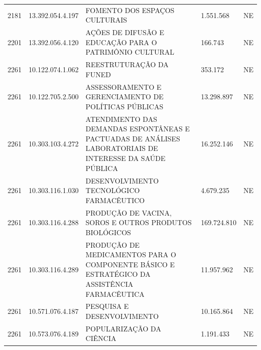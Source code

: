 \documentclass{article}
\begin{document}
\begin{longtable}[c]{m{1cm}|m{2cm}|m{10cm}|m{2cm}|m{1cm}}
\multicolumn{1}{C{1cm}|}{2181} & \multicolumn{1}{C{2cm}|}{13.392.054.4.197} & \multicolumn{1}{L{10cm}|}{FOMENTO DOS ESPAÇOS CULTURAIS} & \multicolumn{1}{R{2cm}|}{1.551.568} & \multicolumn{1}{C{1cm}}{NE} \\
\multicolumn{1}{C{1cm}|}{2201} & \multicolumn{1}{C{2cm}|}{13.392.056.4.120} & \multicolumn{1}{L{10cm}|}{AÇÕES DE DIFUSÃO E EDUCAÇÃO PARA O PATRIMÔNIO CULTURAL} & \multicolumn{1}{R{2cm}|}{166.743} & \multicolumn{1}{C{1cm}}{NE} \\
\multicolumn{1}{C{1cm}|}{2261} & \multicolumn{1}{C{2cm}|}{10.122.074.1.062} & \multicolumn{1}{L{10cm}|}{REESTRUTURAÇÃO DA FUNED} & \multicolumn{1}{R{2cm}|}{353.172} & \multicolumn{1}{C{1cm}}{NE} \\
\multicolumn{1}{C{1cm}|}{2261} & \multicolumn{1}{C{2cm}|}{10.122.705.2.500} & \multicolumn{1}{L{10cm}|}{ASSESSORAMENTO E GERENCIAMENTO DE POLÍTICAS PÚBLICAS} & \multicolumn{1}{R{2cm}|}{13.298.897} & \multicolumn{1}{C{1cm}}{NE} \\
\multicolumn{1}{C{1cm}|}{2261} & \multicolumn{1}{C{2cm}|}{10.303.103.4.272} & \multicolumn{1}{L{10cm}|}{ATENDIMENTO DAS DEMANDAS ESPONTÂNEAS E PACTUADAS DE ANÁLISES LABORATORIAIS DE INTERESSE DA SAÚDE PÚBLICA} & \multicolumn{1}{R{2cm}|}{16.252.146} & \multicolumn{1}{C{1cm}}{NE} \\
\multicolumn{1}{C{1cm}|}{2261} & \multicolumn{1}{C{2cm}|}{10.303.116.1.030} & \multicolumn{1}{L{10cm}|}{DESENVOLVIMENTO TECNOLÓGICO FARMACÊUTICO} & \multicolumn{1}{R{2cm}|}{4.679.235} & \multicolumn{1}{C{1cm}}{NE} \\
\multicolumn{1}{C{1cm}|}{2261} & \multicolumn{1}{C{2cm}|}{10.303.116.4.288} & \multicolumn{1}{L{10cm}|}{PRODUÇÃO DE VACINA, SOROS E OUTROS PRODUTOS BIOLÓGICOS} & \multicolumn{1}{R{2cm}|}{169.724.810} & \multicolumn{1}{C{1cm}}{NE} \\
\multicolumn{1}{C{1cm}|}{2261} & \multicolumn{1}{C{2cm}|}{10.303.116.4.289} & \multicolumn{1}{L{10cm}|}{PRODUÇÃO DE MEDICAMENTOS PARA O COMPONENTE BÁSICO E ESTRATÉGICO DA ASSISTÊNCIA FARMACÊUTICA} & \multicolumn{1}{R{2cm}|}{11.957.962} & \multicolumn{1}{C{1cm}}{NE} \\
\multicolumn{1}{C{1cm}|}{2261} & \multicolumn{1}{C{2cm}|}{10.571.076.4.187} & \multicolumn{1}{L{10cm}|}{PESQUISA E DESENVOLVIMENTO} & \multicolumn{1}{R{2cm}|}{10.165.864} & \multicolumn{1}{C{1cm}}{NE} \\
\multicolumn{1}{C{1cm}|}{2261} & \multicolumn{1}{C{2cm}|}{10.573.076.4.189} & \multicolumn{1}{L{10cm}|}{POPULARIZAÇÃO DA CIÊNCIA} & \multicolumn{1}{R{2cm}|}{1.191.433} & \multicolumn{1}{C{1cm}}{NE} \\

\end{longtable}
\end{document}
